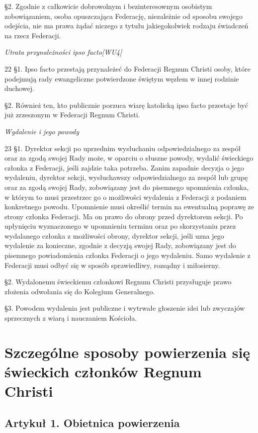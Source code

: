 ﻿\documentclass{report}
\newcommand{\lett}[1]{\lettrine[findent=6pt]{#1}{}}
\newcommand{\ssec}[1]{\vspace{1em}\textit{#1}\vspace{.5em}\nopagebreak}
\begin{document}
\S{}2. Zgodnie z całkowicie dobrowolnym i bezinteresownym osobistym zobowiązaniem, osoba opuszczająca Federację, niezależnie od sposobu swojego odejścia, nie ma prawa żądać niczego z tytułu jakiegokolwiek rodzaju świadczeń na rzecz Federacji.


\ssec{Utrata przynależności ipso facto[WU4] }


\lett{22} \S{}1. Ipso facto przestają przynależeć do Federacji Regnum Christi osoby, które podejmują rady ewangeliczne potwierdzone świętym węzłem w innej rodzinie duchowej.


\S{}2. Również ten, kto publicznie porzuca wiarę katolicką ipso facto przestaje być już zrzeszonym w Federacji Regnum Christi.
 
\ssec{Wydalenie i jego powody}
 
\lett{23} \S{}1. Dyrektor sekcji po uprzednim wysłuchaniu odpowiedzialnego za zespół oraz za zgodą swojej Rady może, w oparciu o słuszne powody, wydalić świeckiego członka z Federacji, jeśli zajdzie taka potrzeba. Zanim zapadnie decyzja o jego wydaleniu, dyrektor sekcji, wysłuchawszy odpowiedzialnego za zespół lub grupę oraz za zgodą swojej Rady, zobowiązany jest do pisemnego upomnienia członka, w którym to musi przestrzec go o możliwości wydalenia z Federacji z podaniem konkretnego powodu. Upomnienie musi określić termin na ewentualną poprawę ze strony członka Federacji. Ma on prawo do obrony przed dyrektorem sekcji. Po upłynięciu wyznaczonego w upomnieniu terminu oraz po skorzystaniu przez wydalanego członka z możliwości obrony, dyrektor sekcji, jeśli uzna jego wydalenie za konieczne, zgodnie z decyzją swojej Rady, zobowiązany jest do pisemnego powiadomienia członka Federacji o jego wydaleniu. Samo wydalenie z Federacji musi odbyć się w sposób sprawiedliwy, rozsądny i miłosierny.


\S{}2. Wydalonemu świeckiemu członkowi Regnum Christi przysługuje prawo złożenia odwołania się do Kolegium Generalnego.


\S{}3. Powodem wydalenia jest publiczne i wytrwałe głoszenie idei lub zwyczajów sprzecznych z wiarą i nauczaniem Kościoła.


\chapter{Szczególne sposoby powierzenia się świeckich członków Regnum Christi}


\section{Artykuł 1. Obietnica powierzenia}
 
\end{document}
